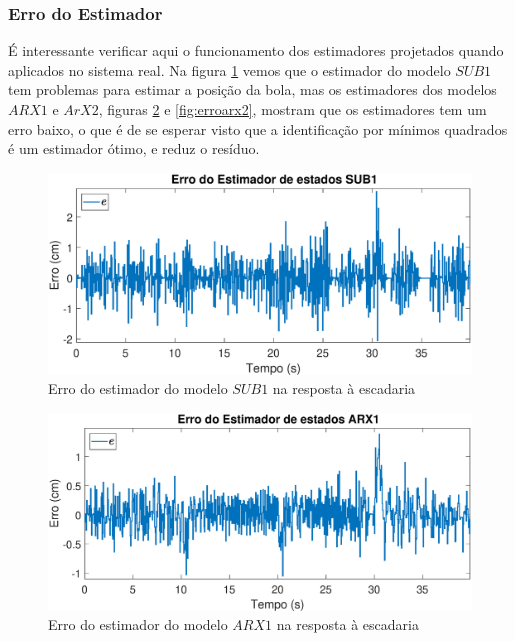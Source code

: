 \subsubsection{Erro do Estimador} \label{erroest}
 É interessante verificar aqui o funcionamento dos estimadores projetados quando aplicados no sistema real. Na figura \ref{fig:errosub1} vemos que o estimador do modelo $SUB1$ tem problemas para estimar a posição da bola, mas os estimadores dos modelos $ARX1$ e $ArX2$, figuras \ref{fig:erroarx1} e \ref{fig:erroarx2}, mostram que os estimadores tem um erro baixo, o que é de se esperar visto que a identificação por mínimos quadrados é um estimador ótimo, e reduz o resíduo.
\begin{figure}[htb]
	\centering
	\includegraphics[width=1\linewidth]{errosub1}
	\caption[Erro do estimador do modelo $SUB1$ na resposta à escadaria]{Erro do estimador do modelo $SUB1$ na resposta à escadaria}
	\label{fig:errosub1}
\end{figure}

\begin{figure}[htb]
	\centering
	\includegraphics[width=1\linewidth]{erroarx1}
	\caption[Erro do estimador do modelo $ARX1$ na resposta à escadaria]{Erro do estimador do modelo $ARX1$ na resposta à escadaria}
	\label{fig:erroarx1}
\end{figure}

